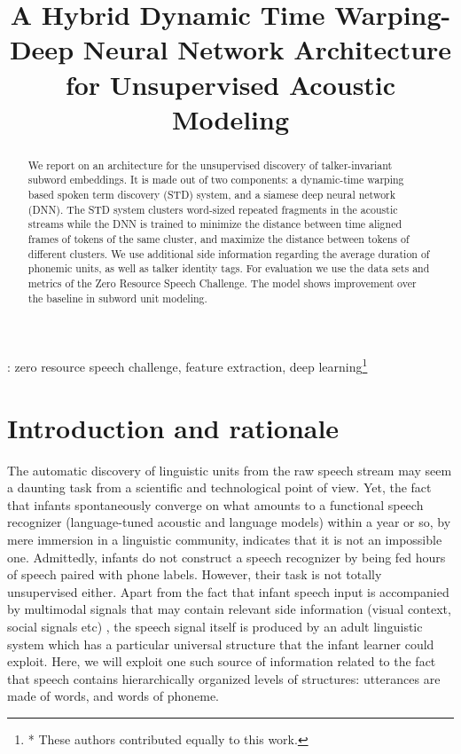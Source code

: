 \documentclass[a4paper]{article}
\title{A Hybrid Dynamic Time Warping-Deep Neural Network Architecture for Unsupervised Acoustic Modeling}
\begin{document}
\maketitle

\begin{abstract}
We report on an architecture for the unsupervised discovery of talker-invariant subword embeddings. It is made out of two components: a dynamic-time warping based spoken term discovery (STD) system, and a siamese deep neural network (DNN). The STD system clusters word-sized repeated fragments in the acoustic streams while the DNN is trained to minimize the distance between time aligned frames of tokens of the same cluster, and maximize the distance between tokens of different clusters. We use additional side information regarding the average duration of phonemic units, as well as talker identity tags. For evaluation we use the data sets and metrics of the Zero Resource Speech Challenge. The model shows improvement over the baseline in subword unit modeling.
\end{abstract}
: zero resource speech challenge, feature extraction, deep learning\let\thefootnote\relax\footnote{* These authors contributed equally to this work.}


\section{Introduction and rationale}
The automatic discovery of linguistic units from the raw speech stream \cite{} may seem a daunting task from a scientific and technological point of view. Yet, the fact that infants spontaneously converge on what amounts to a functional speech recognizer (language-tuned acoustic and language models) within a year or so, by mere immersion in a linguistic community, indicates that it is not an impossible one. Admittedly, infants do not construct a speech recognizer by being fed hours of speech paired with phone labels. However, their task is not totally unsupervised either. Apart from the fact that infant speech input is accompanied by multimodal signals that may contain relevant side information (visual context, social signals etc) , the speech signal itself is produced by an adult linguistic system which has a particular universal structure  that the infant learner could exploit. Here, we will exploit one  such source of information related to the fact that speech contains hierarchically organized levels of structures: utterances are made of words, and words of phoneme.
\end{document}

